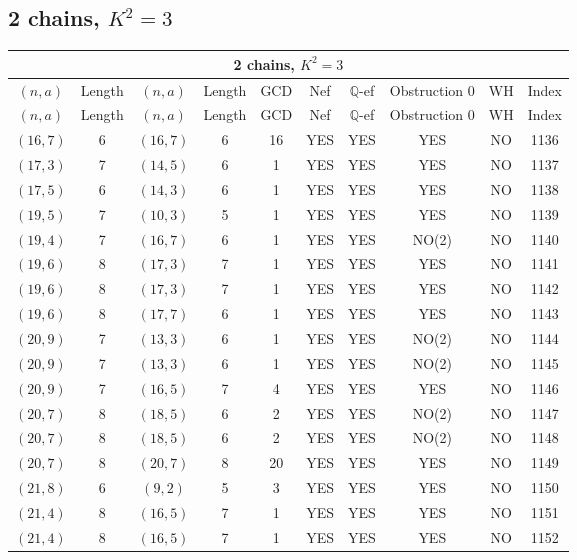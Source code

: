 \subsection{2 chains, $K^2 = 3$}
\begin{longtable}{|c|c|c|c|c|c|c|c|c|c|}
\hline
\multicolumn{10}{|c|}{2 chains, $K^2 = 3$}\\
\hline
$(n,a)$ & Length & $(n,a)$ & Length & GCD & Nef & $\mathbb Q$-ef & Obstruction 0 & WH & Index\\
\hline
\endfirsthead

\hline
$(n,a)$ & Length & $(n,a)$ & Length & GCD & Nef & $\mathbb Q$-ef & Obstruction 0 & WH & Index\\
\hline
\endhead
\hline
\endfoot

$(16, 7)$ & 6 & $(16, 7)$ & 6 & 16 & YES & YES & YES & NO & 1136\\
$(17, 3)$ & 7 & $(14, 5)$ & 6 & 1 & YES & YES & YES & NO & 1137\\
$(17, 5)$ & 6 & $(14, 3)$ & 6 & 1 & YES & YES & YES & NO & 1138\\
$(19, 5)$ & 7 & $(10, 3)$ & 5 & 1 & YES & YES & YES & NO & 1139\\
$(19, 4)$ & 7 & $(16, 7)$ & 6 & 1 & YES & YES & NO(2) & NO & 1140\\
$(19, 6)$ & 8 & $(17, 3)$ & 7 & 1 & YES & YES & YES & NO & 1141\\
$(19, 6)$ & 8 & $(17, 3)$ & 7 & 1 & YES & YES & YES & NO & 1142\\
$(19, 6)$ & 8 & $(17, 7)$ & 6 & 1 & YES & YES & YES & NO & 1143\\
$(20, 9)$ & 7 & $(13, 3)$ & 6 & 1 & YES & YES & NO(2) & NO & 1144\\
$(20, 9)$ & 7 & $(13, 3)$ & 6 & 1 & YES & YES & NO(2) & NO & 1145\\
$(20, 9)$ & 7 & $(16, 5)$ & 7 & 4 & YES & YES & YES & NO & 1146\\
$(20, 7)$ & 8 & $(18, 5)$ & 6 & 2 & YES & YES & NO(2) & NO & 1147\\
$(20, 7)$ & 8 & $(18, 5)$ & 6 & 2 & YES & YES & NO(2) & NO & 1148\\
$(20, 7)$ & 8 & $(20, 7)$ & 8 & 20 & YES & YES & YES & NO & 1149\\
$(21, 8)$ & 6 & $(9, 2)$ & 5 & 3 & YES & YES & YES & NO & 1150\\
$(21, 4)$ & 8 & $(16, 5)$ & 7 & 1 & YES & YES & YES & NO & 1151\\
$(21, 4)$ & 8 & $(16, 5)$ & 7 & 1 & YES & YES & YES & NO & 1152\\

\end{longtable}

